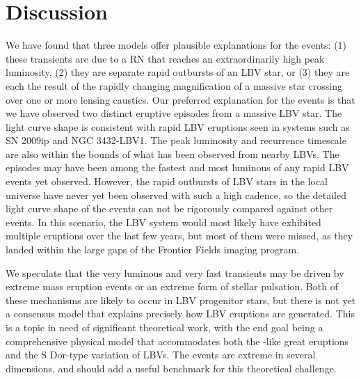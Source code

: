 \section{Discussion}\label{sec:Discussion}

We have found that three models offer plausible explanations for the
\spock events: (1) these transients are due to a RN that reaches an
extraordinarily high peak luminosity, (2) they are separate rapid
outbursts of an LBV star, or (3) they are each the result of the
rapidly changing magnification of a massive star crossing over one or
more lensing caustics.  Our preferred explanation for the \spock
events is that we have observed two distinct eruptive episodes from a
massive LBV star.  The light curve shape is consistent with rapid LBV
eruptions seen in systems such as SN 2009ip and NGC 3432-LBV1.  The
peak luminosity and recurrence timescale are also within the bounds of
what has been observed from nearby LBVs.  The \spock episodes may have
been among the fastest and most luminous of any rapid LBV events yet
observed. However, the rapid outbursts of LBV stars in the local
universe have never yet been observed with such a high cadence, so the
detailed light curve shape of the \spock events can not be rigorously
compared against other events.  In this scenario, the \spock LBV
system would most likely have exhibited multiple eruptions over the
last few years, but most of them were missed, as they landed within
the large gaps of the \HST Frontier Fields imaging program.

We speculate that the very luminous and very fast \spock transients
may be driven by extreme mass eruption events or an extreme form of
stellar pulsation.  Both of these mechanisms are likely to occur in
LBV progenitor stars, but there is not yet a consensus model that
explains precisely how LBV eruptions are generated. This is a topic in
need of significant theoretical work, with the end goal being a
comprehensive physical model that accommodates both the \etacar-like
great eruptions and the S Dor-type variation of LBVs.  The \spock
events are extreme in several dimensions, and should add a useful
benchmark for this theoretical challenge.

